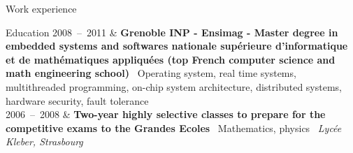 \documentclass{cv}
\newcommand{\lieu}[1]{\textsl{#1}\ }
\newcommand{\activite}[1]{\textbf{#1}\ }
\newcommand{\comment}[1]{{#1}\ }
\newcommand{\group}[1]{\hspace{1em}\textsl{#1}\ }
\newcommand{\hs}{\hspace{1.6em}}
\begin{document}
\begin{rubriquetableau}[2.5cm]{Work experience}
%


%

\end{rubriquetableau}


\begin{rubriquetableau}[2.5cm]{Education}
2008~--~2011            & \activite{Grenoble INP - Ensimag - Master degree in embedded systems and softwares
                        \newlineÉcole nationale supérieure d'informatique et de mathématiques appliquées
                        \newline(top French computer science and math engineering school)}
                        \comment{\newline Operating system, real time systems, multithreaded programming, on-chip system architecture, distributed systems, hardware security, fault tolerance} \\

2006~--~2008            & \activite{Two-year highly selective classes to prepare for the competitive exams to the Grandes Ecoles} \comment{Mathematics, physics} \lieu{Lycée Kleber, Strasbourg}
\end{rubriquetableau}
\end{document}
